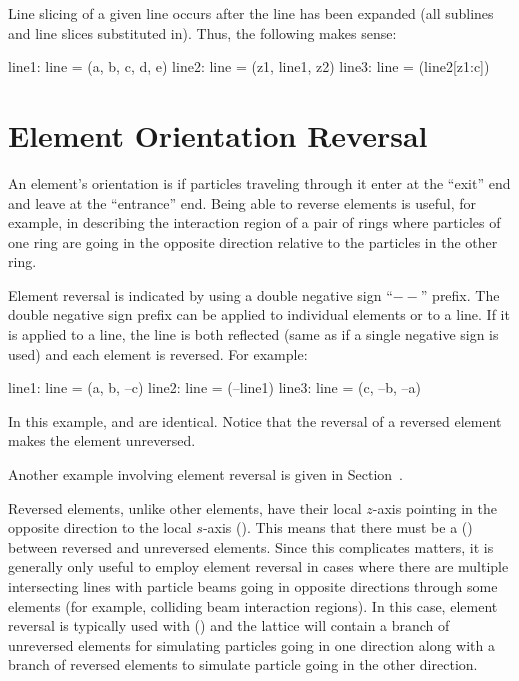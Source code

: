 Line slicing of a given line occurs after the line has been expanded (all sublines and line slices
substituted in). Thus, the following makes sense:
\begin{example}
  line1: line = (a, b, c, d, e)
  line2: line = (z1, line1, z2)
  line3: line = (line2[z1:c])
\end{example}

\section{Element Orientation Reversal}
\label{s:ele.reverse}

An element's orientation is  if particles traveling through it enter at the ``exit'' end and leave at
the ``entrance'' end. Being able to reverse elements is useful, for example, in describing the
interaction region of a pair of rings where particles of one ring are going in the opposite
direction relative to the particles in the other ring.

Element reversal is indicated by using a double negative sign ``$--$'' prefix. The double negative
sign prefix can be applied to individual elements or to a line. If it is applied to a line, the line
is both reflected (same as if a single negative sign is used) and each element is reversed. For
example:
\begin{example}
  line1: line = (a, b, --c)
  line2: line = (--line1)
  line3: line = (c, --b, --a)
\end{example}
In this example,  and  are identical. Notice that the reversal of a reversed
element makes the element unreversed.

Another example involving element reversal is given in Section~.

Reversed elements, unlike other elements, have their local $z$-axis pointing in the opposite
direction to the local $s$-axis (). This means that there must be a
 () between reversed and unreversed elements. Since this
complicates matters, it is generally only useful to employ element reversal in cases where there are
multiple intersecting lines with particle beams going in opposite directions through some elements
(for example, colliding beam interaction regions). In this case, element reversal is typically used
with  () and the lattice will contain a branch of unreversed
elements for simulating particles going in one direction along with a branch of reversed elements to
simulate particle going in the other direction.

